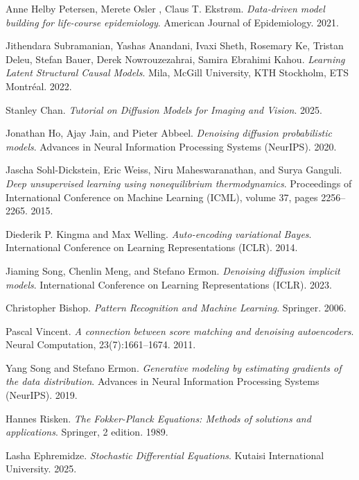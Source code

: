 \documentclass{article}
\begin{document}
\begin{thebibliography}{9}
	Anne Helby Petersen, Merete Osler , Claus T. Ekstrøm. \textit{Data-driven model building for life-course epidemiology}. American Journal of Epidemiology. 
	2021.
	
	Jithendara Subramanian, Yashas Anandani, Ivaxi Sheth, Rosemary Ke, Tristan Deleu, Stefan Bauer, Derek Nowrouzezahrai, Samira Ebrahimi Kahou. 
	\textit{Learning Latent Structural Causal Models}. 
	Mila, McGill University, KTH Stockholm, ETS Montréal.
	2022.
	
	Stanley Chan.
	\textit{Tutorial on Diffusion Models for Imaging and Vision}.
	2025.
	
	Jonathan Ho, Ajay Jain, and Pieter Abbeel. 
	\textit{Denoising diffusion probabilistic models}. 
	Advances in Neural Information Processing Systems (NeurIPS). 
	2020.
	
	Jascha Sohl-Dickstein, Eric Weiss, Niru Maheswaranathan, and Surya Ganguli. 
	\textit{Deep unsupervised learning using nonequilibrium thermodynamics}.
	Proceedings of International Conference on Machine Learning (ICML), volume 37, pages 2256–2265.
	2015.
	
	Diederik P. Kingma and Max Welling. 
	\textit{Auto-encoding variational Bayes}. 
	International Conference on Learning Representations (ICLR).
	2014.
	
	Jiaming Song, Chenlin Meng, and Stefano Ermon. 
	\textit{Denoising diffusion implicit models}. 
	International Conference on Learning Representations (ICLR).
	2023.
	
	Christopher Bishop.
	\textit{Pattern Recognition and Machine Learning}.
	Springer. 
	2006.
	
	Pascal Vincent. 
	\textit{A connection between score matching and denoising autoencoders}.
	Neural Computation, 23(7):1661–1674.
	2011.
	
	Yang Song and Stefano Ermon. 
	\textit{Generative modeling by estimating gradients of the data distribution}.
	Advances in Neural Information Processing Systems (NeurIPS).
	2019.
	
	Hannes Risken. 
	\textit{The Fokker-Planck Equations: Methods of solutions and applications}.
	Springer, 2 edition. 
	1989.
	
	Lasha Ephremidze.
	\textit{Stochastic Differential Equations}.
	Kutaisi International University.
	2025.
	

\end{thebibliography}
\end{document}
